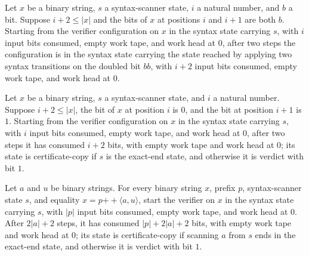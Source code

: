 \begin{lemma}
\label{Complexity.taut_syntax_double}
\leanok
{}
Let $x$ be a binary string, $s$ a syntax-scanner state, $i$ a natural number, and $b$ a
bit. Suppose $i+2\le |x|$ and the bits of $x$ at positions $i$ and $i+1$ are both $b$.
Starting from the verifier configuration on $x$ in the syntax state carrying $s$, with
$i$ input bits consumed, empty work tape, and work head at $0$, after two steps the
configuration is in the syntax state carrying the state reached by applying two syntax
transitions on the doubled bit $bb$, with $i+2$ input bits consumed, empty work tape,
and work head at $0$.
\end{lemma}

\begin{lemma}
\label{Complexity.taut_syntax_separator}
\leanok
{}
Let $x$ be a binary string, $s$ a syntax-scanner state, and $i$ a natural number.
Suppose $i+2\le |x|$, the bit of $x$ at position $i$ is $0$, and the bit at position
$i+1$ is $1$. Starting from the verifier configuration on $x$ in the syntax state
carrying $s$, with $i$ input bits consumed, empty work tape, and work head at $0$, after
two steps it has consumed $i+2$ bits, with empty work tape and work head at $0$; its
state is certificate-copy if $s$ is the exact-end state, and otherwise it is verdict
with bit $1$.
\end{lemma}

\begin{lemma}
\label{Complexity.taut_syntax_run}
\leanok
{}
Let $a$ and $u$ be binary strings. For every binary string $x$, prefix $p$,
syntax-scanner state $s$, and equality $x=p\mathbin{+\!\!+}\langle a,u\rangle$, start the
verifier on $x$ in the syntax state carrying $s$, with $|p|$ input bits consumed, empty
work tape, and work head at $0$. After $2|a|+2$ steps, it has consumed $|p|+2|a|+2$
bits, with empty work tape and work head at $0$; its state is certificate-copy if
scanning $a$ from $s$ ends in the exact-end state, and otherwise it is verdict with bit
$1$.
\end{lemma}

